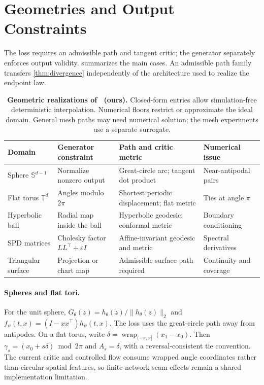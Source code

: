 \section{Geometries and Output Constraints}
\label{sec:geometries}
The loss requires an admissible path and tangent critic; the generator separately enforces output validity.  summarizes the main cases. An admissible path family transfers \cref{thm:divergence} independently of the architecture used to realize the endpoint law.

\begin{table}[t]
\caption{\textbf{Geometric realizations of \RMGM\ (ours).} Closed-form entries allow simulation-free deterministic interpolation. Numerical floors restrict or approximate the ideal domain. General mesh paths may need numerical solution; the mesh experiments use a separate surrogate.}
\label{tab:geometries}
\centering
\small
\begin{tabular}{@{}llll@{}}
\toprule
Domain & Generator constraint & Path and critic metric & Numerical issue \\
\midrule
Sphere $\mathbb S^{d-1}$ & Normalize nonzero output & Great-circle arc; tangent dot product & Near-antipodal pairs \\
Flat torus $\mathbb T^d$ & Angles modulo $2\pi$ & Shortest periodic displacement; flat metric & Ties at angle $\pi$ \\
Hyperbolic ball & Radial map inside the ball & Hyperbolic geodesic; conformal metric & Boundary conditioning \\
SPD matrices & Cholesky factor $LL^\top+\varepsilon I$ & Affine-invariant geodesic and metric & Spectral derivatives \\
Triangular surface & Projection or chart map & Admissible surface path required & Continuity and coverage \\
\bottomrule
\end{tabular}
\end{table}

\paragraph{Spheres and flat tori.}
For the unit sphere, $G_\theta(z)=h_\theta(z)/\|h_\theta(z)\|_2$ and $f_\psi(t,x)=(I-xx^\top)h_\psi(t,x)$. The loss uses the great-circle path away from antipodes. On a flat torus, write $\delta=\operatorname{wrap}_{(-\pi,\pi]}(x_1-x_0)$. Then $\gamma_s=(x_0+s\delta)\bmod 2\pi$ and $A_s=\delta$, with a reversal-consistent tie convention. The current critic and controlled flow consume wrapped angle coordinates rather than circular spatial features, so finite-network seam effects remain a shared implementation limitation.

